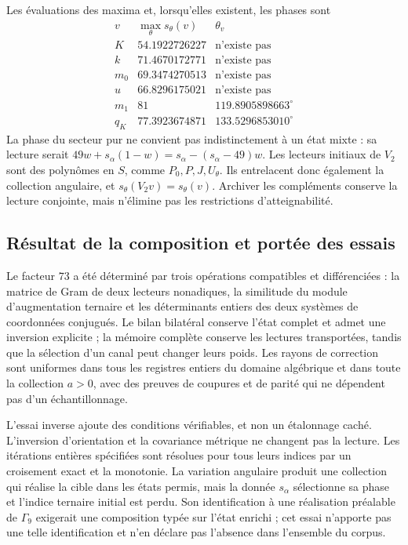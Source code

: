 Les évaluations des maxima et, lorsqu’elles existent, les phases sont
\[
\begin{array}{c|c|c}
 v&\max_\theta s_\theta(v)&\theta_v\\\hline
 K&54.1922726227&\text{n’existe pas}\\
 k&71.4670172771&\text{n’existe pas}\\
 m_0&69.3474270513&\text{n’existe pas}\\
 u&66.8296175021&\text{n’existe pas}\\
 m_1&81&119.8905898663^\circ\\
 q_K&77.3923674871&133.5296853010^\circ
\end{array}
\]
La phase du secteur pur ne convient pas indistinctement à un état
mixte : sa lecture serait
\(49w+s_\alpha(1-w)=s_\alpha-(s_\alpha-49)w\).
Les lecteurs initiaux de \(V_2\) sont des polynômes en \(S\), comme
\(P_0,P,J,U_\theta\). Ils entrelacent donc également la collection
angulaire, et \(s_\theta(V_2v)=s_\theta(v)\). Archiver les
compléments conserve la lecture conjointe, mais n’élimine pas les
restrictions d’atteignabilité.

\subsection{Résultat de la composition et portée des essais}
\label{lib02:alcance}

Le facteur \(73\) a été déterminé par trois opérations
compatibles et différenciées : la matrice de Gram de deux lecteurs nonadiques, la
similitude du module d’augmentation ternaire et les déterminants entiers des
deux systèmes de coordonnées conjugués. Le bilan bilatéral conserve l’état
complet et admet une inversion explicite ; la mémoire complète conserve les
lectures transportées, tandis que la sélection d’un canal peut changer
leurs poids. Les rayons de correction sont uniformes dans tous les registres
entiers du domaine algébrique et dans toute la collection \(a>0\), avec des
preuves de coupures et de parité qui ne dépendent pas d’un échantillonnage.

L’essai inverse ajoute des conditions vérifiables, et non un étalonnage
caché. L’inversion d’orientation et la covariance métrique ne changent pas
la lecture. Les itérations entières spécifiées sont résolues pour
tous leurs indices par un croisement exact et la monotonie. La variation angulaire
produit une collection qui réalise la cible dans les états permis,
mais la donnée \(s_\alpha\) sélectionne sa phase et l’indice
ternaire initial est perdu. Son identification à une réalisation préalable de
\(\Gamma_9\) exigerait une composition typée sur l’état
enrichi ; cet essai n’apporte pas une telle identification et n’en déclare pas
l’absence dans l’ensemble du corpus.

